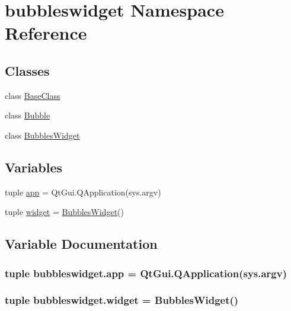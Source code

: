 \hypertarget{namespacebubbleswidget}{}\section{bubbleswidget Namespace Reference}
\label{namespacebubbleswidget}
\subsection*{Classes}
\begin{DoxyCompactItemize}
\item 
class \hyperlink{classbubbleswidget_1_1BaseClass}{Base\+Class}
\item 
class \hyperlink{classbubbleswidget_1_1Bubble}{Bubble}
\item 
class \hyperlink{classbubbleswidget_1_1BubblesWidget}{Bubbles\+Widget}
\end{DoxyCompactItemize}
\subsection*{Variables}
\begin{DoxyCompactItemize}
\item 
tuple \hyperlink{namespacebubbleswidget_a3f1f4eace0993048d95e1da566c01f1a}{app} = Qt\+Gui.\+Q\+Application(sys.\+argv)
\item 
tuple \hyperlink{namespacebubbleswidget_a1b8d4919c1e6b5075a27b14f756b956f}{widget} = \hyperlink{classbubbleswidget_1_1BubblesWidget}{Bubbles\+Widget}()
\end{DoxyCompactItemize}


\subsection{Variable Documentation}
\hypertarget{namespacebubbleswidget_a3f1f4eace0993048d95e1da566c01f1a}{}
\subsubsection[{app}]{\setlength{\rightskip}{0pt plus 5cm}tuple bubbleswidget.\+app = Qt\+Gui.\+Q\+Application(sys.\+argv)}\label{namespacebubbleswidget_a3f1f4eace0993048d95e1da566c01f1a}
\hypertarget{namespacebubbleswidget_a1b8d4919c1e6b5075a27b14f756b956f}{}
\subsubsection[{widget}]{\setlength{\rightskip}{0pt plus 5cm}tuple bubbleswidget.\+widget = {\bf Bubbles\+Widget}()}\label{namespacebubbleswidget_a1b8d4919c1e6b5075a27b14f756b956f}
